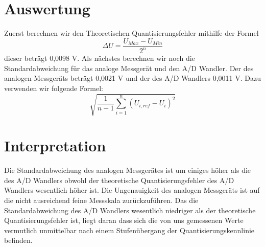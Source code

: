 \documentclass[TGAI_Laborbericht.tex]{subfiles}
\begin{document}
\section{Auswertung}
\label{chap:VERSUCH_1_AUSWERTUNG}
Zuerst berechnen wir den Theoretischen Quantisierungsfehler mithilfe der Formel \[\Delta U = \frac{U_{Max}-U_{Min}}{2^{n}} \] dieser beträgt 0,0098 V. Als nächstes berechnen wir noch die Standardabweichung für das analoge Messgerät  und den A/D Wandler. Der des analogen Messgeräts beträgt 0,0021 V und der des A/D Wandlers 0,0011 V. Dazu verwenden wir folgende Formel: \[\sqrt{\frac{1}{n-1}\sum_{i=1}^n(U_{i,ref}-U_i)^2}\]

\section{Interpretation}
\label{chap:VERSUCH_1_INTERPRETATION}
Die Standardabweichung des analogen Messgerätes ist um einiges höher als die des A/D Wandlers obwohl der theoretische Quantisierungsfehler des A/D Wandlers wesentlich höher ist. Die Ungenauigkeit des analogen Messgeräts ist auf die nicht ausreichend feine Messskala zurückzuführen.
Das die Standardabweichung des A/D Wandlers wesentlich niedriger als der theoretische Quantisierungsfehler ist, liegt daran dass sich die von uns gemessenen Werte vermutlich unmittelbar nach einem Stufenübergang der Quantisierungskennlinie befinden.
\end{document}
